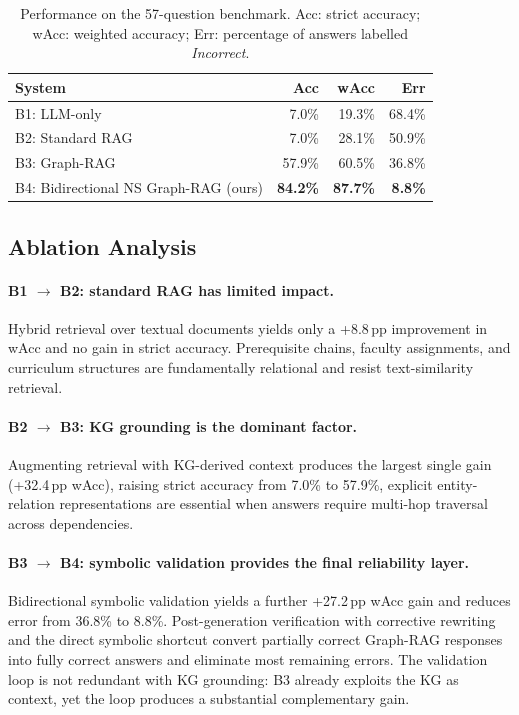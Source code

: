 \documentclass[runningheads]{llncs}
\begin{document}
\begin{table}[t]
\caption{Performance on the 57-question benchmark. Acc: strict accuracy; wAcc: weighted accuracy; Err: percentage of answers labelled \textit{Incorrect}.}
\label{tab:results}
\centering
\begin{tabular}{lrrr}
\hline
\textbf{System} & \textbf{Acc} & \textbf{wAcc} & \textbf{Err} \\
\hline
B1: LLM-only & 7.0\% & 19.3\% & 68.4\% \\
B2: Standard RAG & 7.0\% & 28.1\% & 50.9\% \\
B3: Graph-RAG & 57.9\% & 60.5\% & 36.8\% \\
B4: Bidirectional NS Graph-RAG (ours) & \textbf{84.2\%} & \textbf{87.7\%} & \textbf{8.8\%} \\
\hline
\end{tabular}
\end{table}

\subsection{Ablation Analysis}

\paragraph{B1 $\rightarrow$ B2: standard RAG has limited impact.} Hybrid retrieval over textual documents yields only a +8.8\,pp improvement in wAcc and no gain in strict accuracy. Prerequisite chains, faculty assignments, and curriculum structures are fundamentally relational and resist text-similarity retrieval.

\paragraph{B2 $\rightarrow$ B3: KG grounding is the dominant factor.} Augmenting retrieval with KG-derived context produces the largest single gain (+32.4\,pp wAcc), raising strict accuracy from 7.0\% to 57.9\%, explicit entity-relation representations are essential when answers require multi-hop traversal across dependencies.

\paragraph{B3 $\rightarrow$ B4: symbolic validation provides the final reliability layer.} Bidirectional symbolic validation yields a further +27.2\,pp wAcc gain and reduces error from 36.8\% to 8.8\%. Post-generation verification with corrective rewriting and the direct symbolic shortcut convert partially correct Graph-RAG responses into fully correct answers and eliminate most remaining errors. The validation loop is not redundant with KG grounding: B3 already exploits the KG as context, yet the loop produces a substantial complementary gain.
\end{document}
